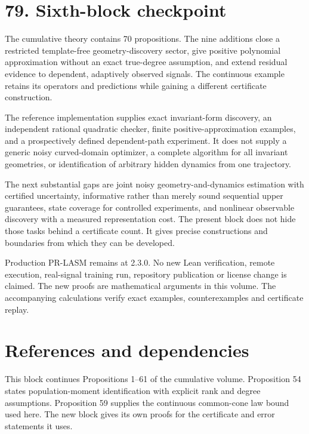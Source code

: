 \documentclass[11pt,letterpaper]{article}
\begin{document}
\section{79. Sixth-block checkpoint}\label{sixth-block-checkpoint}

The cumulative theory contains 70 propositions. The nine additions close
a restricted template-free geometry-discovery sector, give positive
polynomial approximation without an exact true-degree assumption, and
extend residual evidence to dependent, adaptively observed signals. The
continuous example retains its operators and predictions while gaining a
different certificate construction.

The reference implementation supplies exact invariant-form discovery, an
independent rational quadratic checker, finite positive-approximation
examples, and a prospectively defined dependent-path experiment. It does
not supply a generic noisy curved-domain optimizer, a complete algorithm
for all invariant geometries, or identification of arbitrary hidden
dynamics from one trajectory.

The next substantial gaps are joint noisy geometry-and-dynamics
estimation with certified uncertainty, informative rather than merely
sound sequential upper guarantees, state coverage for controlled
experiments, and nonlinear observable discovery with a measured
representation cost. The present block does not hide those tasks behind
a certificate count. It gives precise constructions and boundaries from
which they can be developed.

Production PR-LASM remains at 2.3.0. No new Lean verification, remote
execution, real-signal training run, repository publication or license
change is claimed. The new proofs are mathematical arguments in this
volume. The accompanying calculations verify exact examples,
counterexamples and certificate replay. \begingroup \small

\raggedright

\section{References and dependencies}\label{references-and-dependencies}

This block continues Propositions 1--61 of the cumulative volume.
Proposition 54 states population-moment identification with explicit
rank and degree assumptions. Proposition 59 supplies the continuous
common-cone law bound used here. The new block gives its own proofs for
the certificate and error statements it uses.
\end{document}
